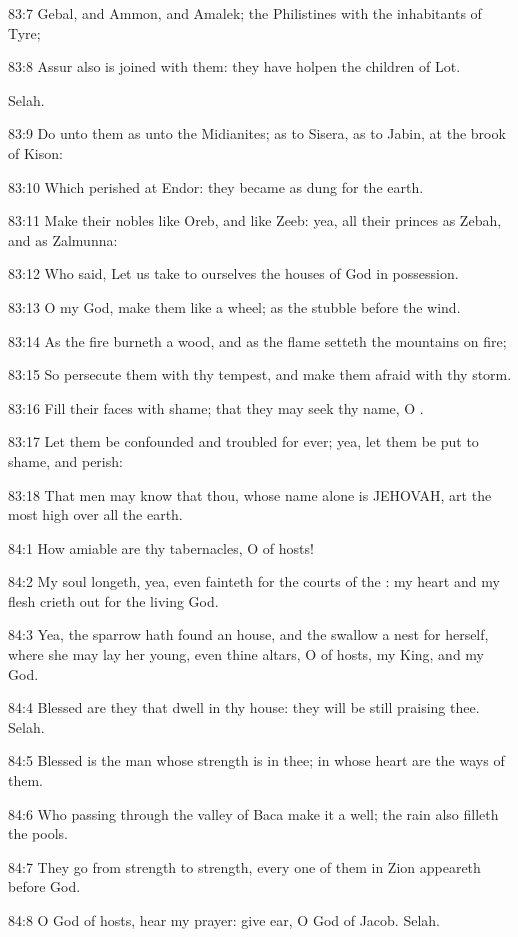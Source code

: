 83:7 Gebal, and Ammon, and Amalek; the Philistines with the inhabitants of Tyre;

83:8 Assur also is joined with them: they have holpen the children of Lot.

Selah.

83:9 Do unto them as unto the Midianites; as to Sisera, as to Jabin, at the brook of Kison:

83:10 Which perished at Endor: they became as dung for the earth.

83:11 Make their nobles like Oreb, and like Zeeb: yea, all their princes as Zebah, and as Zalmunna:

83:12 Who said, Let us take to ourselves the houses of God in possession.

83:13 O my God, make them like a wheel; as the stubble before the wind.

83:14 As the fire burneth a wood, and as the flame setteth the mountains on fire;

83:15 So persecute them with thy tempest, and make them afraid with thy storm.

83:16 Fill their faces with shame; that they may seek thy name, O \LORD.

83:17 Let them be confounded and troubled for ever; yea, let them be put to shame, and perish:

83:18 That men may know that thou, whose name alone is JEHOVAH, art the most high over all the earth.



84:1 How amiable are thy tabernacles, O \LORD of hosts!

84:2 My soul longeth, yea, even fainteth for the courts of the \LORD: my heart and my flesh crieth out for the living God.

84:3 Yea, the sparrow hath found an house, and the swallow a nest for herself, where she may lay her young, even thine altars, O \LORD of hosts, my King, and my God.

84:4 Blessed are they that dwell in thy house: they will be still praising thee. Selah.

84:5 Blessed is the man whose strength is in thee; in whose heart are the ways of them.

84:6 Who passing through the valley of Baca make it a well; the rain also filleth the pools.

84:7 They go from strength to strength, every one of them in Zion appeareth before God.

84:8 O \LORD God of hosts, hear my prayer: give ear, O God of Jacob.  Selah.

